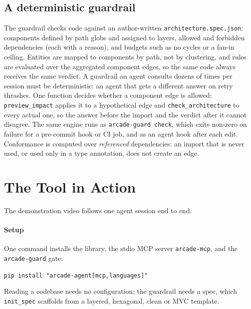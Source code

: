 \documentclass[10pt,conference]{IEEEtran}
\newcommand{\tool}[1]{\texttt{#1}}
\begin{document}
\begin{table}[t]
  \centering
  \caption{Tokens per access path: reading the source, the full graph and
  architecture, the same under \tool{max\_tokens}{=}8000, and \tool{summarize}.}
  \label{tab:budget}
  \footnotesize
  \BudgetTable
\end{table}

\subsection{A deterministic guardrail}
The guardrail checks code against an author-written
\tool{architecture.spec.json}: components defined by path globs and assigned to
layers, allowed and forbidden dependencies (each with a reason), and budgets
such as no cycles or a fan-in ceiling. Entities are mapped to components by
path, not by clustering, and rules are evaluated over the aggregated
component edges, so the same code always receives the same verdict. A guardrail
an agent consults dozens of times per session must be deterministic: an agent
that gets a different answer on retry thrashes. One function decides whether a
component edge is allowed; \tool{preview\_impact} applies it to a hypothetical
edge and \tool{check\_architecture} to every actual one, so the answer before
the import and the verdict after it cannot disagree. The same engine runs as
\tool{arcade-guard check}, which exits non-zero on failure for a pre-commit hook
or CI job, and as an agent hook after each edit. Conformance is computed over
\emph{referenced} dependencies: an import that is never used, or used only in a
type annotation, does not create an edge.

\section{The Tool in Action}
\label{sec:action}
The demonstration video follows one agent session end to end.

\paragraph*{Setup}
One command installs the library, the stdio MCP server
\tool{arcade-mcp}, and the \tool{arcade-guard} gate:
\centerline{\tool{pip install "arcade-agent[mcp,languages]"}} Reading a codebase needs no configuration; the
guardrail needs a spec, which \tool{init\_spec} scaffolds from a layered,
hexagonal, clean or MVC template.
\end{document}
